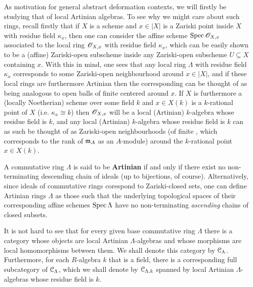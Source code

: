             As motivation for general abstract deformation contexts, we will firstly be studying that of local Artinian algebras. To see why we might care about such rings, recall firstly that if $X$ is a scheme and $x \in |X|$ is a Zariski point inside $X$ with residue field $\kappa_x$, then one can consider the affine scheme $\operatorname{Spec} \mathscr{O}_{X, x}$ associated to the local ring $\mathscr{O}_{X, x}$ with residue field $\kappa_x$, which can be easily shown to be a (affine) Zariski-open subscheme inside any Zariski-open subscheme $U \subseteq X$ containing $x$. With this in mind, one sees that any local ring $\Lambda$ with residue field $\kappa_x$ corresponds to some  Zariski-open neighbourhood around $x \in |X|$, and if these local rings are furthermore Artinian then the corresponding  can be thought of as being analogous to open balls of finite  centered around $x$. If $X$ is furthermore a (locally Noetherian) scheme over some field $k$ and $x \in X(k)$ is a $k$-rational point of $X$ (i.e. $\kappa_x \cong k$) then $\mathscr{O}_{X, x}$ will be a local (Artinian) $k$-algebra whose residue field is $k$, and any local (Artinian) $k$-algebra whose residue field is $k$ can as such be thought of as  Zariski-open neighbourhoods (of finite , which corresponds to the rank of $\mathfrak{m}_A$ as an $A$-module) around the $k$-rational point $x \in X(k)$. 
            \begin{definition} \label{def: artinian_rings} 
                A commutative ring $\Lambda$ is said to be \textbf{Artinian} if and only if there exist no non-terminating descending chain of ideals (up to bijections, of course). Alternatively, since ideals of commutative rings corespond to Zariski-closed sets, one can define Artinian rings $\Lambda$ as those such that the underlying topological spaces of their corresponding affine schemes $\operatorname{Spec} \Lambda$ have no non-terminating \textit{ascending} chains of closed subsets. 
                
                It is not hard to see that for every given base commutative ring $\Lambda$ there is a category whose objects are local Artinian $\Lambda$-algebras and whose morphisms are local homomorphisms between them. We shall denote this category by $\mathcal{C}_{\Lambda}$. Furthermore, for each $R$-algebra $k$ that is a field, there is a corresponding full subcategory of $\mathcal{C}_{\Lambda}$, which we shall denote by $\mathcal{C}_{\Lambda, k}$ spanned by local Artinian $\Lambda$-algebras whose residue field is $k$. 
            \end{definition}
            
